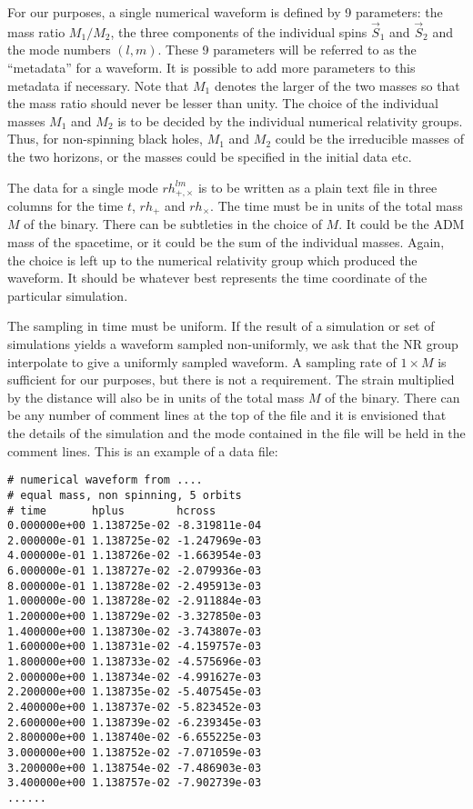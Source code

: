 \documentclass{article}
\numberwithin{equation}{section}
\begin{document}
For our purposes, a single numerical waveform is defined by 9
parameters: the mass ratio $M_1/M_2$, the three components of the
individual spins $\vec{S}_1$ and $\vec{S}_2$ and the mode numbers
$(l,m)$.  These 9 parameters will be referred to as the ``metadata''
for a waveform.  It is possible to add more parameters to this
metadata if necessary. Note that $M_1$ denotes the larger of the two
masses so that the mass ratio should never be lesser than unity.  The
choice of the individual masses $M_1$ and $M_2$ is to be decided by
the individual numerical relativity groups.  Thus, for non-spinning
black holes, $M_1$ and $M_2$ could be the irreducible masses of the
two horizons, or the masses could be specified in the initial data
etc.  

The data for a single mode $rh_{+,\times}^{lm}$ is to be written as a
plain text file in three columns for the time $t$, $rh_+$ and
$rh_\times$.  The time must be in units of the total mass $M$ of the
binary.  There can be subtleties in the choice of $M$.  It could be
the ADM mass of the spacetime, or it could be the sum of the
individual masses.  Again, the choice is left up to the numerical
relativity group which produced the waveform.  It should be whatever
best represents the time coordinate of the particular simulation.  

The sampling in time must be uniform.  If the result of a simulation
or set of simulations yields a waveform sampled non-uniformly, we ask
that the NR group interpolate to give a uniformly sampled waveform.  A
sampling rate of $1\times M$ is sufficient for our purposes, but there
is not a requirement.  The strain multiplied by the distance will also
be in units of the total mass $M$ of the binary.  There can be any
number of comment lines at the top of the file and it is envisioned
that the details of the simulation and the mode contained in the file
will be held in the comment lines.  This is an example of a data file:

\begin{verbatim}
# numerical waveform from ....
# equal mass, non spinning, 5 orbits
# time       hplus        hcross
0.000000e+00 1.138725e-02 -8.319811e-04
2.000000e-01 1.138725e-02 -1.247969e-03
4.000000e-01 1.138726e-02 -1.663954e-03
6.000000e-01 1.138727e-02 -2.079936e-03
8.000000e-01 1.138728e-02 -2.495913e-03
1.000000e-00 1.138728e-02 -2.911884e-03
1.200000e+00 1.138729e-02 -3.327850e-03
1.400000e+00 1.138730e-02 -3.743807e-03
1.600000e+00 1.138731e-02 -4.159757e-03
1.800000e+00 1.138733e-02 -4.575696e-03
2.000000e+00 1.138734e-02 -4.991627e-03
2.200000e+00 1.138735e-02 -5.407545e-03
2.400000e+00 1.138737e-02 -5.823452e-03
2.600000e+00 1.138739e-02 -6.239345e-03
2.800000e+00 1.138740e-02 -6.655225e-03
3.000000e+00 1.138752e-02 -7.071059e-03
3.200000e+00 1.138754e-02 -7.486903e-03
3.400000e+00 1.138757e-02 -7.902739e-03
......
\end{verbatim}
\end{document}
